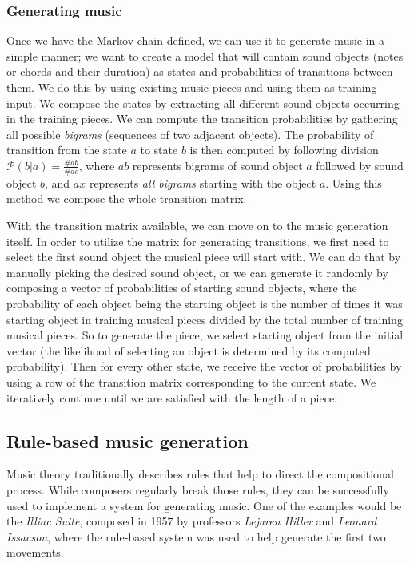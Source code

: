 \subsubsection{Generating music}\label{subsubsec:generating-music}

Once we have the Markov chain defined, we can use it to generate music in a simple manner;
we want to create a model that will contain sound objects (notes or chords and their duration) as states and probabilities of transitions between them.
We do this by using existing music pieces and using them as training input.
We compose the states by extracting all different sound objects occurring in the training pieces.
We can compute the transition probabilities by gathering all possible \textit{bigrams} (sequences of two adjacent objects).
The probability of transition from the state $a$ to state $b$ is then computed by following division $\mathcal{P}(b \rvert a) = \frac{\# ab}{\# ac}$, where $ab$ represents bigrams of sound object $a$ followed by sound object $b$, and $ax$ represents \textit{all bigrams} starting with the object $a$.
Using this method we compose the whole transition matrix.

With the transition matrix available, we can move on to the music generation itself.
In order to utilize the matrix for generating transitions, we first need to select the first sound object the musical piece will start with.
We can do that by manually picking the desired sound object, or we can generate it randomly by composing a vector of probabilities of starting sound objects, where the probability of each object being the starting object is the number of times it was starting object in training musical pieces divided by the total number of training musical pieces.
So to generate the piece, we select starting object from the initial vector (the likelihood of selecting an object is determined by its computed probability).
Then for every other state, we receive the vector of probabilities by using a row of the transition matrix corresponding to the current state.
We iteratively continue until we are satisfied with the length of a piece.~\cite{markov-chains}

\subsection{Rule-based music generation}\label{subsec:rule-based}

Music theory traditionally describes rules that help to direct the compositional process.
While composers regularly break those rules, they can be successfully used to implement a system for generating music.
One of the examples would be the \textit{Illiac Suite}, composed in 1957 by professors \textit{Lejaren Hiller} and \textit{Leonard Issacson}, where the rule-based system was used to help generate the first two movements.~\cite{computational-creativity}

